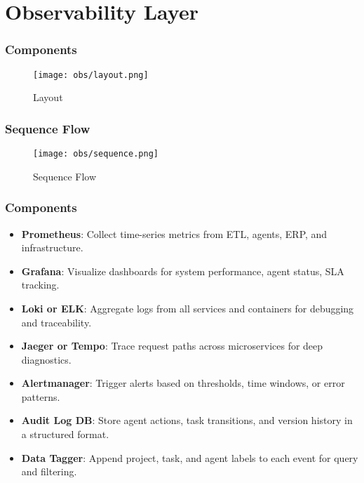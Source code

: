 \section{Observability Layer}
\begin{frame}
    \frametitle{ Components}
    \begin{figure}
        \centering
        \texttt{[image: obs/layout.png]} %
        \caption{Layout}
    \end{figure}
\end{frame}

\begin{frame}
    \frametitle{Sequence Flow}
    \begin{figure}
        \centering
        \texttt{[image: obs/sequence.png]} %
        \caption{Sequence Flow}
    \end{figure}
\end{frame}


\begin{frame}
    \frametitle{Components}
    \begin{itemize}
        \item \textbf{Prometheus}: Collect time-series metrics from ETL, agents, ERP, and infrastructure.
        \item \textbf{Grafana}: Visualize dashboards for system performance, agent status, SLA tracking.
        \item \textbf{Loki or ELK}: Aggregate logs from all services and containers for debugging and traceability.
        \item \textbf{Jaeger or Tempo}: Trace request paths across microservices for deep diagnostics.
        \item \textbf{Alertmanager}: Trigger alerts based on thresholds, time windows, or error patterns.
        \item \textbf{Audit Log DB}: Store agent actions, task transitions, and version history in a structured format.
        \item \textbf{Data Tagger}: Append project, task, and agent labels to each event for query and filtering.
    \end{itemize}
\end{frame}


